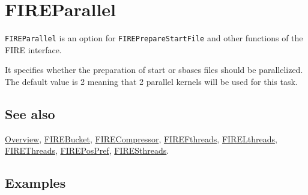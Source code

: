 \documentclass[../FeynHelpersManual.tex]{subfiles}
\begin{document}
\hypertarget{fireparallel}{
\section{FIREParallel}\label{fireparallel}}

\texttt{FIREParallel} is an option for \texttt{FIREPrepareStartFile} and
other functions of the FIRE interface.

It specifies whether the preparation of start or sbases files should be
parallelized. The default value is 2 meaning that 2 parallel kernels
will be used for this task.

\subsection{See also}

\hyperlink{toc}{Overview}, \hyperlink{firebucket}{FIREBucket},
\hyperlink{firecompressor}{FIRECompressor},
\hyperlink{firefthreads}{FIREFthreads},
\hyperlink{firelthreads}{FIRELthreads},
\hyperlink{firethreads}{FIREThreads},
\hyperlink{firepospref}{FIREPosPref},
\hyperlink{firesthreads}{FIRESthreads}.

\subsection{Examples}
\end{document}
